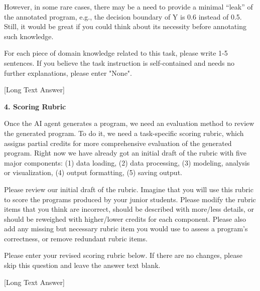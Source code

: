 \begin{tcolorbox}
However, in some rare cases, there may be a need to provide a minimal “leak” of the annotated program, e.g., the decision boundary of Y is 0.6 instead of 0.5. Still, it would be great if you could think about its necessity before annotating such knowledge.

For each piece of domain knowledge related to this task, please write 1-5 sentences. If you believe the task instruction is self-contained and needs no further explanations, please enter "None".

[Long Text Answer]

\textbf{4. Scoring Rubric}

Once the AI agent generates a program, we need an evaluation method to review the generated program. To do it, we need a task-specific scoring rubric, which assigns partial credits for more comprehensive evaluation of the generated program. Right now we have already got an initial draft of the rubric with five major components: (1) data loading, (2) data processing, (3) modeling, analysis or visualization, (4) output formatting, (5) saving output.

Please review our initial draft of the rubric. Imagine that you will use this rubric to score the programs produced by your junior students. Please modify the rubric items that you think are incorrect, should be described with more/less details, or should be reweighed with higher/lower credits for each component. Please also add any missing but necessary rubric item you would use to assess a program’s correctness, or remove redundant rubric items.

Please enter your revised scoring rubric below. If there are no changes, please skip this question and leave the answer text blank.

[Long Text Answer]
\end{tcolorbox}